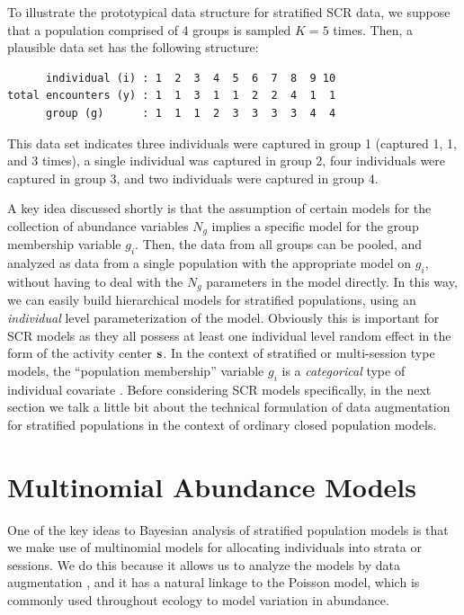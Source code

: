 To illustrate the prototypical data structure for stratified SCR data,
we suppose that a population comprised of 4 groups is sampled
$K=5$ times. Then, a plausible data set has the following structure:
\begin{verbatim}
      individual (i) : 1  2  3  4  5  6  7  8  9 10
total encounters (y) : 1  1  3  1  1  2  2  4  1  1
      group (g)      : 1  1  1  2  3  3  3  3  4  4
\end{verbatim}
This data set indicates three individuals were captured in
group 1 (captured 1, 1, and 3 times), a single individual was
captured in group 2, four individuals were captured in group
3, and two individuals were captured in group 4.

A key idea discussed shortly is that the assumption of certain models
for the collection of abundance variables $N_{g}$ implies a specific
model for the group membership variable $g_{i}$.  Then, the data from
all groups can be pooled, and analyzed as data from a single
population with the appropriate model on $g_{i}$, without having to
deal with the $N_{g}$ parameters in the model directly. In this way,
we can easily build hierarchical models for stratified populations,
using an {\it individual} level parameterization of the
model. Obviously this is important for SCR models as they all possess
at least one individual level random effect in the form of the
activity center ${\bf s}$.  In the context of stratified or
multi-session type models, the ``population membership'' variable
$g_{i}$ is a {\it categorical} type of individual covariate
\citep{huggins:1989, alho:1990, royle:2009}.  Before considering SCR
models specifically, in the next section we talk a little bit about
the technical formulation of data augmentation for stratified
populations in the context of ordinary closed population models.


\section{Multinomial Abundance Models}

One of the key ideas to Bayesian analysis of stratified population
models is that we make use of multinomial models for allocating
individuals into strata or sessions. We do this because it allows us
to analyze the models by data augmentation \citep{converse_royle:2012,
  royle_converse:2013}, and it has a natural linkage to the Poisson
model, which is commonly used throughout ecology to model variation in
abundance. 


